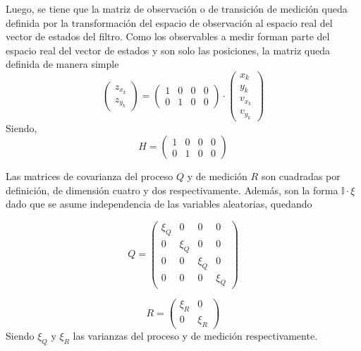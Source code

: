 Luego, se tiene que la matriz de observación o de transición de medición queda definida por la transformación del espacio de observación al espacio real del vector de estados del filtro. Como los observables a medir forman parte del espacio real del vector de estados y son solo las posiciones, la matriz queda definida de manera simple
\begin{equation}
\begin{pmatrix} z_{x_{k}} \\ z_{y_{k}} \end{pmatrix}=\begin{pmatrix}
1 & 0 & 0  & 0\\
0 & 1  & 0 & 0  \end{pmatrix} \cdot  \begin{pmatrix} x_k \\ y_k \\ v_{x_{k}} \\ v_{y_{k}}
\end{pmatrix}
\end{equation}
Siendo,
\begin{equation}
H = 
\begin{pmatrix}
1 & 0 & 0  & 0\\
0 & 1  & 0 & 0 
\end{pmatrix}
\end{equation}

Las matrices de covarianza del proceso $Q$ y de medición $R$ son cuadradas por definición, de dimensión cuatro y dos respectivamente. Además, son la forma $\mathbb{I}\cdot \xi$ dado que se asume independencia de las variables aleatorias, quedando

\begin{equation}
Q = 
\begin{pmatrix}
\xi_Q & 0 & 0  & 0\\
0 & \xi_Q  & 0 & 0\\
0 & 0  & \xi_Q  & 0\\
0 & 0  & 0  & \xi_Q 
\end{pmatrix}
\end{equation}

\begin{equation}
R = 
\begin{pmatrix}
\xi_R & 0 \\
0 & \xi_R 
\end{pmatrix}
\end{equation}
Siendo $\xi_Q$ y $\xi_R$ las varianzas del proceso y de medición respectivamente.

